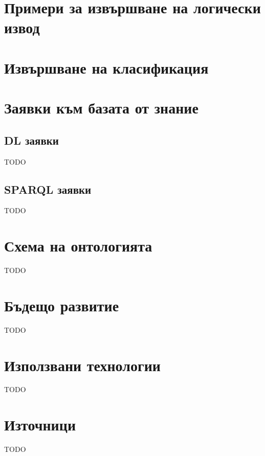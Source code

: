 \documentclass[12pt]{article}
\begin{document}
\section{Примери за извършване на логически извод}








\section{Извършване на класификация}






\section{Заявки към базата от знание}

\subsection{DL заявки}

TODO

\subsection{SPARQL заявки}

TODO







\section{Схема на онтологията}

TODO



\section{Бъдещо развитие}

TODO




\section{Използвани технологии}

TODO







\listoffigures

\section{Източници}

TODO
\end{document}

